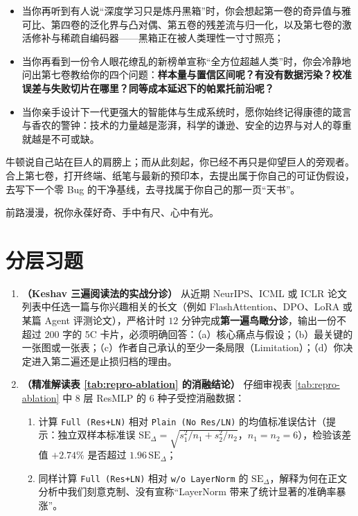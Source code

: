 \begin{itemize}
  \item 当你再听到有人说“深度学习只是炼丹黑箱”时，你会想起第一卷的奇异值与雅可比、第四卷的泛化界与凸对偶、第五卷的残差流与归一化，以及第七卷的激活修补与稀疏自编码器——黑箱正在被人类理性一寸寸照亮；
  \item 当你再看到一份令人眼花缭乱的新榜单宣称“全方位超越人类”时，你会冷静地问出第七卷教给你的四个问题：\textbf{样本量与置信区间呢？有没有数据污染？校准误差与失败切片在哪里？同等成本延迟下的帕累托前沿呢？}
  \item 当你亲手设计下一代更强大的智能体与生成系统时，愿你始终记得康德的箴言与香农的警钟：技术的力量越是澎湃，科学的谦逊、安全的边界与对人的尊重就越是不可或缺。
\end{itemize}

牛顿说自己站在巨人的肩膀上；而从此刻起，你已经不再只是仰望巨人的旁观者。合上第七卷，打开终端、纸笔与最新的预印本，去提出属于你自己的可证伪假设，去写下一个零 Bug 的干净基线，去寻找属于你自己的那一页“天书”。

前路漫漫，祝你永葆好奇、手中有尺、心中有光。

\section{分层习题}


\begin{enumerate}[label=\textbf{7.6.\arabic*}]
  \item \textbf{（Keshav 三遍阅读法的实战分诊）} 从近期 NeurIPS、ICML 或 ICLR 论文列表中任选一篇与你兴趣相关的长文（例如 FlashAttention、DPO、LoRA 或某篇 Agent 评测论文），严格计时 $12$ 分钟完成\textbf{第一遍鸟瞰分诊}，输出一份不超过 $200$ 字的 5C 卡片，必须明确回答：（a）核心痛点与假设；（b）最关键的一张图或一张表；（c）作者自己承认的至少一条局限（Limitation）；（d）你决定进入第二遍还是止损归档的理由。

  \item \textbf{（精准解读表 \ref{tab:repro-ablation} 的消融结论）} 仔细审视表 \ref{tab:repro-ablation} 中 8 层 ResMLP 的 6 种子受控消融数据：
  \begin{enumerate}
    \item 计算 \texttt{Full (Res+LN)} 相对 \texttt{Plain (No Res/LN)} 的均值标准误估计（提示：独立双样本标准误 $\mathrm{SE}_{\Delta} = \sqrt{s_1^2/n_1 + s_2^2/n_2}$，$n_1 = n_2 = 6$），检验该差值 $+2.74\%$ 是否超过 $1.96\,\mathrm{SE}_\Delta$；
    \item 同样计算 \texttt{Full (Res+LN)} 相对 \texttt{w/o LayerNorm} 的 $\mathrm{SE}_\Delta$，解释为何在正文分析中我们刻意克制、没有宣称“LayerNorm 带来了统计显著的准确率暴涨”。
  \end{enumerate}
\end{enumerate}

